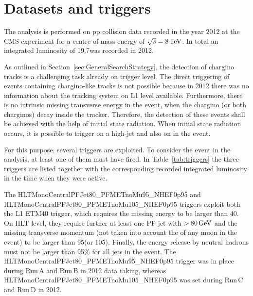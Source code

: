 \section{Datasets and triggers}
\label{sec:DatasetsAndTriggers}

The analysis is performed on pp collision data recorded in the year 2012 at the CMS experiment for a centre-of mass energy of $\sqrt{s}=8\,\text{Te}\kern-0.06667em\text{V}$.
In total an integrated luminosity of 19.7\fbinv was recorded in 2012.

As outlined in Section~\ref{sec:GeneralSearchStrategy}, the detection of chargino tracks is a challenging task already on trigger level.
The direct triggering of events containing chargino-like tracks is not possible because in 2012 there was no information about the tracking system on L1 level available.
Furthermore, there is no intrinsic missing transverse energy in the event, when the chargino (or both charginos) decay inside the tracker.
Therefore, the detection of these events shall be achieved with the help of initial state radiation.
When initial state radiation occurs, it is possible to trigger on a high-\pt jet and also on \met in the event.

For this purpose, several triggers are exploited.
To consider the event in the analysis, at least one of them must have fired.
In Table~\ref{tab:triggers} the three triggers are listed together with the corresponding recorded integrated luminosity in the time when they were active.
\renewcommand{\arraystretch}{1.5}
\begin{table}[!hbt]
\centering
\caption{\met and \met+ jet triggers used in the analysis together with the corresponding recorded integrated luminosity in the time when they were in place.}
\label{tab:triggers}
\end{table}  

The HLTMonoCentralPFJet80\_PFMETnoMu95\_NHEF0p95 and HLTMonoCentralPFJet80\_PFMETnoMu105\_NHEF0p95 triggers exploit both the L1 ETM40 trigger, which requires the missing energy to be larger than 40\gev.
On HLT level, they require further at least one PF jet with \pt$>80\,\text{Ge}\kern-0.06667em\text{V}$ and the missing transverse momentum \met (not taken into account the \pt of any muon in the event) to be larger than 95\gev (or 105\gev).
Finally, the energy release by neutral hadrons must not be larger than 95\% for all jets in the event.
The HLTMonoCentralPFJet80\_PFMETnoMu95\_NHEF0p95 trigger was in place during Run\,A and Run\,B in 2012 data taking, whereas HLTMonoCentralPFJet80\_PFMETnoMu105\_NHEF0p95 was set during Run\,C and Run\,D in 2012.

